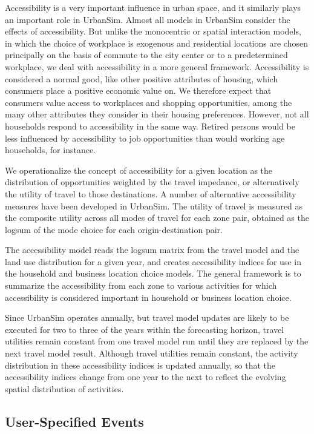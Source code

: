 Accessibility is a very important influence in urban space, and it
similarly plays an important role in UrbanSim.  Almost all models
in UrbanSim consider the effects of accessibility.  But unlike
the monocentric or spatial interaction models, in which the choice
of workplace is exogenous and
residential locations are chosen principally on the basis of
commute to the city center or to a predetermined workplace, we
deal with accessibility in a more general framework. Accessibility
is considered a normal good, like other positive attributes of
housing, which consumers place a positive economic value on.  We
therefore expect that consumers value access to workplaces and
shopping opportunities, among the many other attributes they
consider in their housing preferences. However, not all households
respond to accessibility in the same way. Retired persons would be
less influenced by accessibility to job opportunities than would
working age households, for instance.

We operationalize the concept of accessibility for a given
location as the distribution of opportunities weighted by the
travel impedance, or alternatively the utility of travel to those
destinations.  A number of alternative accessibility measures have
been developed in UrbanSim. The utility of travel is measured as the composite
utility across all modes of travel for each zone pair, obtained as
the logsum of the mode choice for each origin-destination pair.

The accessibility model reads the logsum matrix from the travel
model and the land use distribution for a given year, and creates
accessibility indices for use in the household and business
location choice models. The general framework is to summarize the
accessibility from each zone to various activities for which
accessibility is considered important in household or business
location choice.

Since UrbanSim operates annually, but travel model updates are
likely to be executed for two to three of the years within the
forecasting horizon, travel utilities remain constant from one
travel model run until they are replaced by the next travel model
result. Although travel utilities remain constant, the activity
distribution in these accessibility indices is updated annually,
so that the accessibility indices change from one year to the next
to reflect the evolving spatial distribution of activities.

\subsection{User-Specified Events}

